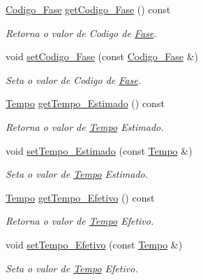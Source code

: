 \begin{DoxyCompactItemize}
\item 
\hyperlink{class_codigo___fase}{\-Codigo\-\_\-\-Fase} \hyperlink{class_fase_a602d9dcd3d2cc62a38815cc92bb2544e}{get\-Codigo\-\_\-\-Fase} () const 
\begin{DoxyCompactList}\small\item\em \-Retorna o valor de \-Codigo de \hyperlink{class_fase}{\-Fase}. \end{DoxyCompactList}\item 
void \hyperlink{class_fase_a8558fc7a14dedece24cb05ef45a468ed}{set\-Codigo\-\_\-\-Fase} (const \hyperlink{class_codigo___fase}{\-Codigo\-\_\-\-Fase} \&)
\begin{DoxyCompactList}\small\item\em \-Seta o valor de \-Codigo de \hyperlink{class_fase}{\-Fase}. \end{DoxyCompactList}\item 
\hyperlink{class_tempo}{\-Tempo} \hyperlink{class_fase_a2745e6795ee74841ab2568bd6634677f}{get\-Tempo\-\_\-\-Estimado} () const 
\begin{DoxyCompactList}\small\item\em \-Retorna o valor de \hyperlink{class_tempo}{\-Tempo} \-Estimado. \end{DoxyCompactList}\item 
void \hyperlink{class_fase_a03725dee42c6222b00278c1e6b335ab7}{set\-Tempo\-\_\-\-Estimado} (const \hyperlink{class_tempo}{\-Tempo} \&)
\begin{DoxyCompactList}\small\item\em \-Seta o valor de \hyperlink{class_tempo}{\-Tempo} \-Estimado. \end{DoxyCompactList}\item 
\hyperlink{class_tempo}{\-Tempo} \hyperlink{class_fase_a19537f118a435b148749fdd965e33e7a}{get\-Tempo\-\_\-\-Efetivo} () const 
\begin{DoxyCompactList}\small\item\em \-Retorna o valor de \hyperlink{class_tempo}{\-Tempo} \-Efetivo. \end{DoxyCompactList}\item 
void \hyperlink{class_fase_ad804992aa80bdb68e6414ab2c16f2e70}{set\-Tempo\-\_\-\-Efetivo} (const \hyperlink{class_tempo}{\-Tempo} \&)
\begin{DoxyCompactList}\small\item\em \-Seta o valor de \hyperlink{class_tempo}{\-Tempo} \-Efetivo. \end{DoxyCompactList}\end{DoxyCompactItemize}



